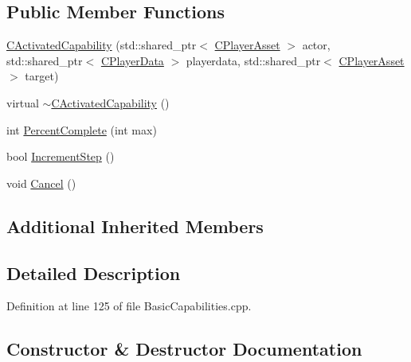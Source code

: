 \subsection*{Public Member Functions}
\begin{DoxyCompactItemize}
\item 
\hyperlink{classCPlayerCapabilityMineHarvest_1_1CActivatedCapability_a236ed97a35a20e2f4b29371089c51a31}{C\+Activated\+Capability} (std\+::shared\+\_\+ptr$<$ \hyperlink{classCPlayerAsset}{C\+Player\+Asset} $>$ actor, std\+::shared\+\_\+ptr$<$ \hyperlink{classCPlayerData}{C\+Player\+Data} $>$ playerdata, std\+::shared\+\_\+ptr$<$ \hyperlink{classCPlayerAsset}{C\+Player\+Asset} $>$ target)
\item 
virtual \hyperlink{classCPlayerCapabilityMineHarvest_1_1CActivatedCapability_a206562e670341a6eb24d0c5dc1bea976}{$\sim$\+C\+Activated\+Capability} ()
\item 
int \hyperlink{classCPlayerCapabilityMineHarvest_1_1CActivatedCapability_ac198166a008306dc543ceed94baaf4a3}{Percent\+Complete} (int max)
\item 
bool \hyperlink{classCPlayerCapabilityMineHarvest_1_1CActivatedCapability_a46dbd6e2ae2fb889da1714c97ed3ca2f}{Increment\+Step} ()
\item 
void \hyperlink{classCPlayerCapabilityMineHarvest_1_1CActivatedCapability_ab1fef064fbc085a6419b5a822e787614}{Cancel} ()
\end{DoxyCompactItemize}
\subsection*{Additional Inherited Members}


\subsection{Detailed Description}


Definition at line 125 of file Basic\+Capabilities.\+cpp.



\subsection{Constructor \& Destructor Documentation}
\hypertarget{classCPlayerCapabilityMineHarvest_1_1CActivatedCapability_a236ed97a35a20e2f4b29371089c51a31}{}\label{classCPlayerCapabilityMineHarvest_1_1CActivatedCapability_a236ed97a35a20e2f4b29371089c51a31} 
